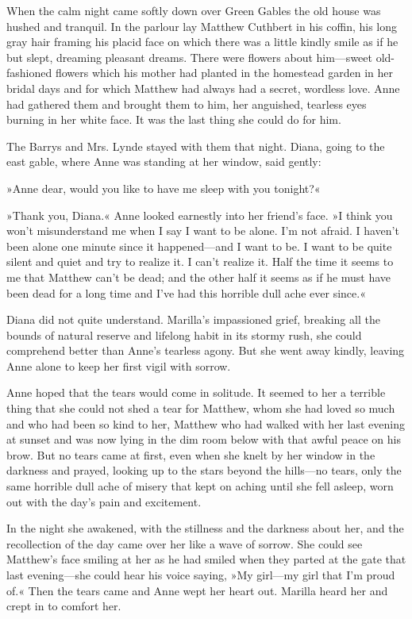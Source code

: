 When the calm night came softly down over Green Gables the old house was hushed and tranquil. In the parlour lay Matthew Cuthbert in his coffin, his long gray hair framing his placid face on which there was a little kindly smile as if he but slept, dreaming pleasant dreams. There were flowers about him—sweet old-fashioned flowers which his mother had planted in the homestead garden in her bridal days and for which Matthew had always had a secret, wordless love. Anne had gathered them and brought them to him, her anguished, tearless eyes burning in her white face. It was the last thing she could do for him.

The Barrys and Mrs. Lynde stayed with them that night. Diana, going to the east gable, where Anne was standing at her window, said gently:

»Anne dear, would you like to have me sleep with you tonight?«

»Thank you, Diana.« Anne looked earnestly into her friend’s face. »I think you won’t misunderstand me when I say I want to be alone. I’m not afraid. I haven’t been alone one minute since it happened—and I want to be. I want to be quite silent and quiet and try to realize it. I can’t realize it. Half the time it seems to me that Matthew can’t be dead; and the other half it seems as if he must have been dead for a long time and I’ve had this horrible dull ache ever since.«

Diana did not quite understand. Marilla’s impassioned grief, breaking all the bounds of natural reserve and lifelong habit in its stormy rush, she could comprehend better than Anne’s tearless agony. But she went away kindly, leaving Anne alone to keep her first vigil with sorrow.

Anne hoped that the tears would come in solitude. It seemed to her a terrible thing that she could not shed a tear for Matthew, whom she had loved so much and who had been so kind to her, Matthew who had walked with her last evening at sunset and was now lying in the dim room below with that awful peace on his brow. But no tears came at first, even when she knelt by her window in the darkness and prayed, looking up to the stars beyond the hills—no tears, only the same horrible dull ache of misery that kept on aching until she fell asleep, worn out with the day’s pain and excitement.

In the night she awakened, with the stillness and the darkness about her, and the recollection of the day came over her like a wave of sorrow. She could see Matthew’s face smiling at her as he had smiled when they parted at the gate that last evening—she could hear his voice saying, »My girl—my girl that I’m proud of.« Then the tears came and Anne wept her heart out. Marilla heard her and crept in to comfort her.


